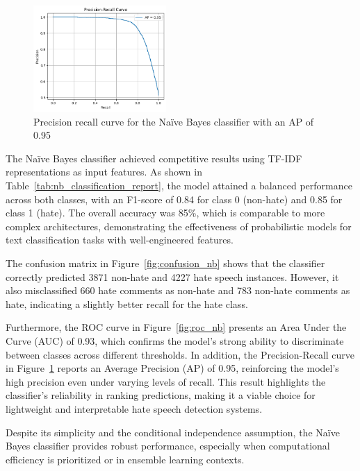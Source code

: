 \begin{figure}[H]
    \centering
    \includegraphics[width=0.45\textwidth]{images/pr_curve_nb.png}
    \caption{Precision recall curve for the Naïve Bayes classifier with an AP of 0.95}
    \label{fig:pr_curve_nb}
\end{figure}

The Naïve Bayes classifier achieved competitive results using TF-IDF representations as input features. As shown in Table~\ref{tab:nb_classification_report}, the model attained a balanced performance across both classes, with an F1-score of 0.84 for class 0 (non-hate) and 0.85 for class 1 (hate). The overall accuracy was 85\%, which is comparable to more complex architectures, demonstrating the effectiveness of probabilistic models for text classification tasks with well-engineered features.

The confusion matrix in Figure~\ref{fig:confusion_nb} shows that the classifier correctly predicted 3871 non-hate and 4227 hate speech instances. However, it also misclassified 660 hate comments as non-hate and 783 non-hate comments as hate, indicating a slightly better recall for the hate class.

Furthermore, the ROC curve in Figure~\ref{fig:roc_nb} presents an Area Under the Curve (AUC) of 0.93, which confirms the model’s strong ability to discriminate between classes across different thresholds. In addition, the Precision-Recall curve in Figure~\ref{fig:pr_curve_nb} reports an Average Precision (AP) of 0.95, reinforcing the model's high precision even under varying levels of recall. This result highlights the classifier’s reliability in ranking predictions, making it a viable choice for lightweight and interpretable hate speech detection systems.

Despite its simplicity and the conditional independence assumption, the Naïve Bayes classifier provides robust performance, especially when computational efficiency is prioritized or in ensemble learning contexts.
